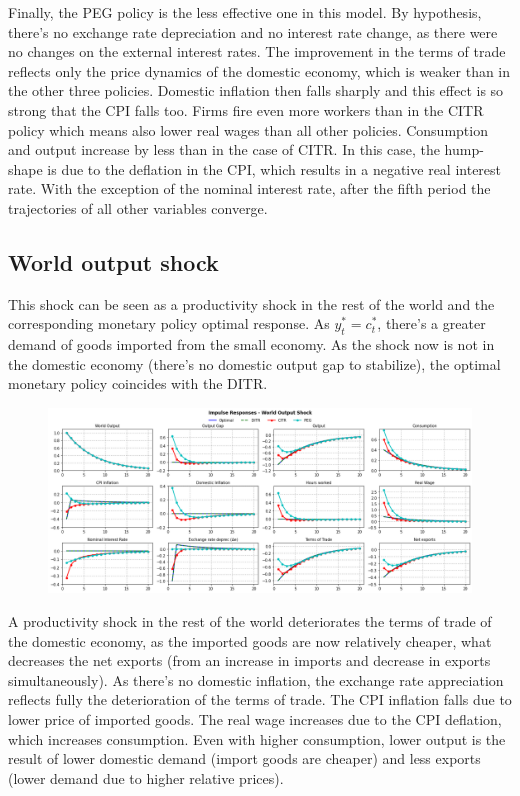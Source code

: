 \documentclass{article}
\begin{document}
Finally, the PEG policy is the less effective one in this model. By hypothesis, there's no exchange rate depreciation and no interest rate change, as there were no changes on the external interest rates. The improvement in the terms of trade reflects only the price dynamics of the domestic economy, which is weaker than in the other three policies. Domestic inflation then falls sharply and this effect is so strong that the CPI falls too. Firms fire even more workers than in the CITR policy which means also lower real wages than all other policies. Consumption and output increase by less than in the case of CITR. In this case, the hump-shape is due to the deflation in the CPI, which results in a negative real interest rate. With the exception of the nominal interest rate, after the fifth period the trajectories of all other variables converge.

\subsection{World output shock}

This shock can be seen as a productivity shock in the rest of the world and the corresponding monetary policy optimal response. As $y_t^*=c_t^*$, there's a greater demand of goods imported from the small economy. As the shock now is not in the domestic economy (there's no domestic output gap to stabilize), the optimal monetary policy coincides with the DITR.

\begin{figure}[H]
\centering
\includegraphics[width=1\textwidth]{img/y_star_shock_rep.png}
\end{figure}

A productivity shock in the rest of the world deteriorates the terms of trade of the domestic economy, as the imported goods are now relatively cheaper, what decreases the net exports (from an increase in imports and decrease in exports simultaneously). As there's no domestic inflation, the exchange rate appreciation reflects fully the deterioration of the terms of trade. The CPI inflation falls due to lower price of imported goods. The real wage increases due to the CPI deflation, which increases consumption. Even with higher consumption, lower output is the result of lower domestic demand (import goods are cheaper) and less exports (lower demand due to higher relative prices). 
\end{document}
